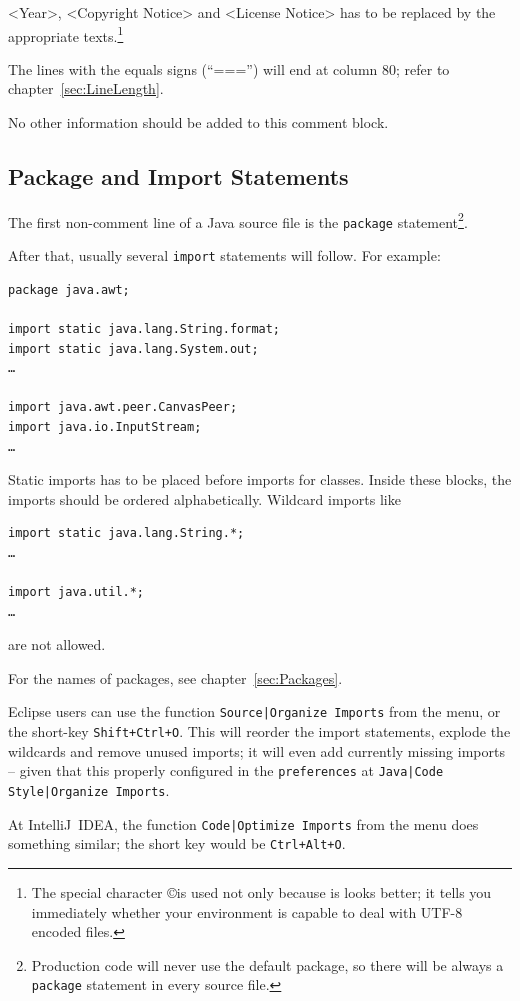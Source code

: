 \documentclass[12pt,a4paper,titlepage, parskip=half, headsepline, footsepline, cleardoubleplain]{scrbook}
\begin{document}
<Year>, <Copyright Notice> and <License Notice> has to be replaced by the appropriate texts.\footnote{The special character \copyright is used not only because is looks better; it tells you immediately whether your environment is capable to deal with UTF-8 encoded files.}

The lines with the equals signs (“===”) will end at column 80; refer to chapter~\vref{sec:LineLength}.

No other information should be added to this comment block.

\subsection{Package and Import Statements}

The first non-comment line of a Java source file is the \lstinline|package| statement\footnote{Production code will never use the default package, so there will be always a \lstinline|package| statement in every source file.}.

After that, usually several \lstinline|import| statements will follow. For example:

\begin{lstlisting}
package java.awt;

import static java.lang.String.format;
import static java.lang.System.out;
…

import java.awt.peer.CanvasPeer;
import java.io.InputStream;
…
\end{lstlisting}

Static imports has to be placed before imports for classes. Inside these blocks, the imports should be ordered alphabetically. Wildcard imports like

\begin{lstlisting}
import static java.lang.String.*;
…

import java.util.*;
…
\end{lstlisting}

are not allowed.

For the names of packages, see chapter~\vref{sec:Packages}.

Eclipse users can use the function \verb#Source|Organize Imports# from the menu, or the short-key \verb#Shift+Ctrl+O#. This will reorder the import statements, explode the wildcards and remove unused imports; it will even add currently missing imports – given that this properly configured in the \verb#preferences# at \verb#Java|Code Style|Organize Imports#.

At IntelliJ~IDEA, the function \verb#Code|Optimize Imports# from the menu does something similar; the short key would be \verb#Ctrl+Alt+O#.
\end{document}
